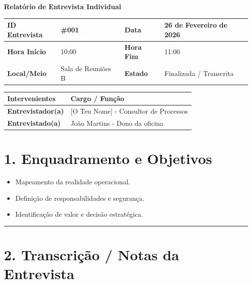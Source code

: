 \documentclass[11pt,a4paper]{article}
\begin{document}
	
	{\noindent\LARGE\bfseries\color{primaryblue} Relatório de Entrevista Individual}
	\\[0.5cm]
	
	\renewcommand{\arraystretch}{1.5}
	\begin{tabularx}{\textwidth}{@{}|l|X|l|X|@{}}
		\hline
		\rowcolor{gray!10} \textbf{ID Entrevista} & \#001 & \textbf{Data} & 26 de Fevereiro de 2026 \\ \hline
		\textbf{Hora Início} & 10:00 & \textbf{Hora Fim} & 11:00 \\ \hline
		\textbf{Local/Meio} & Sala de Reuniões B & \textbf{Estado} & Finalizada / Transcrita \\ \hline
	\end{tabularx}
	
	\vspace{0.5cm}
	
	\begin{tabularx}{\textwidth}{@{}|l|X|@{}}
		\hline
		\rowcolor{gray!10} \textbf{Intervenientes} & \textbf{Cargo / Função} \\ \hline
		\textbf{Entrevistador(a)} & [O Teu Nome] - Consultor de Processos \\ \hline
		\textbf{Entrevistado(a)}  & João Martins - Dono da oficina \\ \hline
	\end{tabularx}
	
	\vspace{0.8cm}
	
	\section*{1. Enquadramento e Objetivos}
	\begin{itemize}[leftmargin=*, label=\small\color{primaryblue}$\blacksquare$]
		\item Mapeamento da realidade operacional.
		\item Definição de responsabilidades e segurança.
		\item Identificação de valor e decisão estratégica.
	\end{itemize}
	
	\hrule %
	\vspace{0.5cm}
	
	\section*{2. Transcrição / Notas da Entrevista}
	
\end{document}
